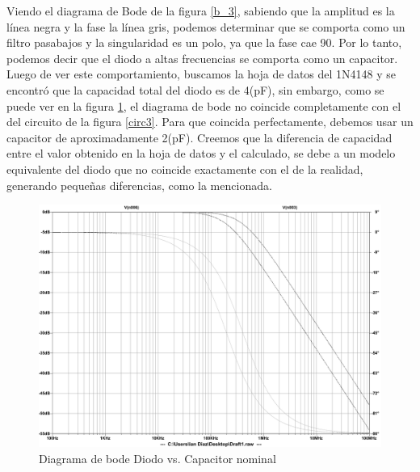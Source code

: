 Viendo el diagrama de Bode de la figura \ref{b_3}, sabiendo que la amplitud es
la l\'inea negra y la fase la l\'inea gris, podemos determinar que se
comporta como un filtro pasabajos y la singularidad es un polo, ya que la fase cae 90\textdegree .
Por lo tanto, podemos decir que el diodo a altas frecuencias se comporta
como un capacitor. Luego de ver este comportamiento, buscamos la hoja
de datos del 1N4148 y se encontr\'o que la capacidad total del diodo
es de 4(pF), sin embargo, como se puede ver en la figura \ref{b2_3},
el diagrama de bode no coincide completamente con el del circuito de la figura
\ref{circ3}. Para que coincida perfectamente, debemos usar un capacitor
de aproximadamente 2(pF). Creemos que la diferencia de capacidad entre
el valor obtenido en la hoja de datos y el calculado, se debe a un
modelo equivalente del diodo que no coincide exactamente con el
de la realidad, generando pequeñas diferencias, como la mencionada.

\begin{figure}[H]
\begin{centering}
\includegraphics[scale=0.5]{../EJ3/Bode2}
\par\end{centering}
\caption{Diagrama de bode Diodo vs. Capacitor nominal}
\label{b2_3}
\end{figure}










